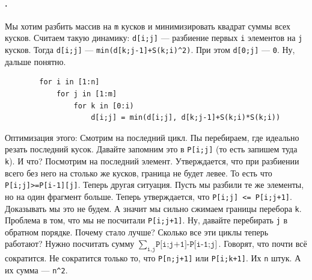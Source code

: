 \documentclass{article}
\newcommand{\pseudo}{PseudoLexer.py:PseudoLexer -x}
\newcommand{\pseudocode}[1]{\texttt{#1}}
\begin{document}
    \paragraph{.}
    Мы хотим разбить массив на \pseudocode{m} кусков и минимизировать квадрат суммы всех кусков. Считаем такую динамику: \pseudocode{d[i;j]} --- разбиение первых \pseudocode{i} элементов на \pseudocode{j} кусков. Тогда \pseudocode{d[i;j]} --- \pseudocode{min(d[k;j-1]+S(k;i)^2)}. При этом \pseudocode{d[0;j]} --- \pseudocode{0}. Ну, дальше понятно.
    \begin{verbatim}
        for i in [1:n]
            for j in [1:m]
                for k in [0:i)
                    d[i;j] = min(d[i;j], d[k;j-1]+S(k;i)*S(k;i))
    \end{verbatim}
    Оптимизация этого: Смотрим на последний цикл. Пы перебираем, где идеально резать последний кусок. Давайте запомним это в \pseudocode{P[i;j]} (то есть запишем туда \pseudocode{k}). И что? Посмотрим на последний элемент. Утверждается, что при разбиении всего без него на столько же кусков, граница не будет левее. То есть что \pseudocode{P[i;j]>=P[i-1][j]}. Теперь другая ситуация. Пусть мы разбили те же элементы, но на один фрагмент больше. Теперь утверждается, что \pseudocode{P[i;j] <= P[i;j+1]}. Доказывать мы это не будем. А значит мы сильно сжимаем границы перебора \pseudocode{k}. Проблема в том, что мы не посчитали \pseudocode{P[i;j+1]}. Ну, давайте перебирать \pseudocode{j} в обратном порядке. Почему стало лучше? Сколько все эти циклы теперь работают? Нужно посчитать сумму $\sum_{\pseudocode{i},\pseudocode{j}}\pseudocode{P[i;j+1]-P[i-1;j]}$. Говорят, что почти всё сократится. Не сократится только то, что \pseudocode{P[n;j+1]} или \pseudocode{P[i;k+1]}. Их \pseudocode{n} штук. А их сумма --- \pseudocode{n^2}.
\end{document}
